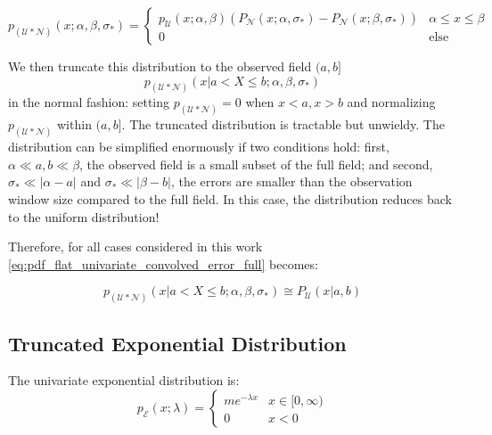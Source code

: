 \documentclass[twocolumn]{aastex631}
\newcommand{\mcal}[1]{\mathcal{#1}}
\newcommand{\Exp}[1]{e^{#1}}
\newcommand{\pdf}{p}
\newcommand{\cdf}{P}
\newcommand{\sigobs}{{\sigma_*}}
\begin{document}
        \begin{equation} \label{eq:flat_distribution}
            \pdf_{(\mcal{U}*\mcal{N})}(x; \alpha, \beta, \sigobs) = \begin{cases}
                \pdf_\mcal{U}(x; \alpha, \beta) \left( \cdf_{\mcal{N}}(x; \alpha, \sigobs) - \cdf_{\mcal{N}}(x; \beta, \sigobs) \right) & \alpha \leq x \leq \beta \\
                0 & \text{else}
            \end{cases}
        \end{equation}

        We then truncate this distribution to the observed field $(a, b]$
        \begin{equation} \label{eq:pdf_flat_univariate_convolved_error_full}
            \pdf_{(\mcal{U}*\mcal{N})}(x | a < X \leq b; \alpha, \beta, \sigobs)
        \end{equation}
        in the normal fashion: setting $\pdf_{(\mcal{U}*\mcal{N})} = 0$ when $x
        < a, x > b$ and normalizing $\pdf_{(\mcal{U}*\mcal{N})}$ within $(a,b]$.
        The truncated distribution is tractable but unwieldy. The distribution
        can be simplified enormously if two conditions hold: first, $\alpha \ll
        a, b \ll \beta$, the observed field is a small subset of the full field;
        and second, $\sigobs \ll |\alpha - a|$ and $\sigobs \ll |\beta - b|$,
        the errors are smaller than the observation window size compared to the
        full field.  In this case, the distribution reduces back to the uniform
        distribution!

        Therefore, for all cases considered in this work
        \eqref{eq:pdf_flat_univariate_convolved_error_full} becomes:

        \begin{equation}\label{eq:pdf_flat_univariate_convolved_error}
            \pdf_{(\mcal{U}*\mcal{N})}(x | a < X \leq b; \alpha, \beta, \sigobs) \cong P_{\mcal{U}}(x|a,b)
        \end{equation}
        

    \vspace{10pt}
    \subsection{Truncated Exponential Distribution} \label{app:sub:exponential_distribution}
    
        The univariate exponential distribution is:
        \begin{equation} \label{eq:pdf_exp_univariate}
            \pdf_{\mcal{E}}(x; \lambda) = \begin{cases}
                m \Exp{-\lambda x} & x \in [0, \infty) \\
                0 & x < 0
            \end{cases}
        \end{equation}
    
\end{document}

